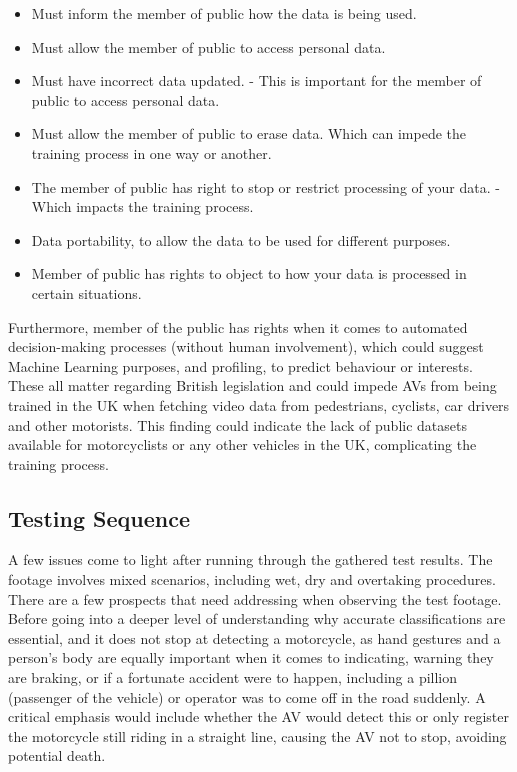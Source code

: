 \documentclass[conference]{IEEEtran}
\begin{document}
		\begin{itemize}
			\item Must inform the member of public how the data is being used.
			\item Must allow the member of public to access personal data.
			\item Must have incorrect data updated. - This is important for the member of public to access personal data.
			\item Must allow the member of public to erase data. Which can impede the training process in one way or another.
			\item The member of public has right to stop or restrict processing of your data. - Which impacts the training process.
			\item Data portability, to allow the data to be used for different purposes.
			\item Member of public has rights to object to how your data is processed in certain situations.
		\end{itemize}

		Furthermore, member of the public has rights when it comes to automated decision-making processes (without human involvement), which could suggest Machine Learning purposes, and profiling, to predict behaviour or interests. These all matter regarding British legislation and could impede AVs from being trained in the UK when fetching video data from pedestrians, cyclists, car drivers and other motorists. This finding could indicate the lack of public datasets available for motorcyclists or any other vehicles in the UK, complicating the training process.

	\subsection{Testing Sequence}
		A few issues come to light after running through the gathered test results. The footage involves mixed scenarios, including wet, dry and overtaking procedures. There are a few prospects that need addressing when observing the test footage. Before going into a deeper level of understanding why accurate classifications are essential, and it does not stop at detecting a motorcycle, as hand gestures and a person's body are equally important when it comes to indicating, warning they are braking, or if a fortunate accident were to happen, including a pillion (passenger of the vehicle) or operator was to come off in the road suddenly. A critical emphasis would include whether the AV would detect this or only register the motorcycle still riding in a straight line, causing the AV not to stop, avoiding potential death. 
			
\end{document}
